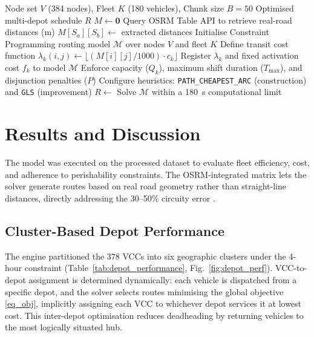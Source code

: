 \documentclass{svproc}
\begin{document}
\begin{algorithm}[t]
\caption{OSRM Chunked Matrix Construction and GLS Initialisation}
\label{algo:mdvrp}
\footnotesize
\begin{algorithmic}[1]
\Require Node set $V$ (384 nodes), Fleet $K$ (180 vehicles), Chunk size $B=50$
\Ensure Optimised multi-depot schedule $R$
\State $M\leftarrow\mathbf{0}$ 
  \State Query OSRM Table API to retrieve real-road distances (m)
  \State $M[S_a][S_b]\leftarrow$ extracted distances
\EndFor
\State Initialise Constraint Programming routing model $\mathcal{M}$ over nodes $V$ and fleet $K$
  \State Define transit cost function $\lambda_k(i,j) \leftarrow \lfloor(M[i][j]/1000)\cdot c_k\rfloor$
  \State Register $\lambda_k$ and fixed activation cost $f_k$ to model $\mathcal{M}$
\EndFor
\State Enforce capacity ($Q_k$), maximum shift duration ($T_{\max}$), and disjunction penalties ($P$)
\State Configure heuristics: \texttt{PATH\_CHEAPEST\_ARC} (construction) and \texttt{GLS} (improvement)
\State $R\leftarrow$ Solve $\mathcal{M}$ within a 180~s computational limit
\end{algorithmic}
\end{algorithm}

\section{Results and Discussion}
\label{sec3}

The model was executed on the processed dataset to evaluate fleet efficiency, cost, and adherence to perishability constraints. The OSRM-integrated matrix lets the solver generate routes based on real road geometry rather than straight-line distances, directly addressing the 30--50\% circuity error \cite{BALLOU2002,Giacomin2015}.

\subsection{Cluster-Based Depot Performance}
\label{subsec3_1}

The engine partitioned the 378 VCCs into six geographic clusters under the 4-hour constraint (Table~\ref{tab:depot_performance}, Fig.~\ref{fig:depot_perf}). VCC-to-depot assignment is determined dynamically: each vehicle is dispatched from a specific depot, and the solver selects routes minimising the global objective \eqref{eq_obj}, implicitly assigning each VCC to whichever depot services it at lowest cost. This inter-depot optimisation reduces deadheading by returning vehicles to the most logically situated hub.
\end{document}
